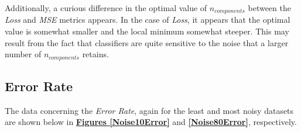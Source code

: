 \documentclass[12pt]{article}
\begin{document}
Additionally, a curious difference in the optimal value of $n_{components}$ between the \textit{Loss} and \textit{MSE} metrics appears. In the case of \textit{Loss}, it appears that the optimal value is somewhat smaller and the local minimum somewhat steeper. This may result from the fact that classifiers are quite sensitive to the noise that a larger number of $n_{components}$ retains.

\subsection{Error Rate}\label{5.4}

The data concerning the \textit{Error Rate}, again for the least and most noisy datasets are shown below in \textbf{\hyperref[Noise10Error]{Figures \ref*{Noise10Error}}} and \textbf{\hyperref[Noise80Error]{\ref*{Noise80Error}}}, respectively.
\end{document}

